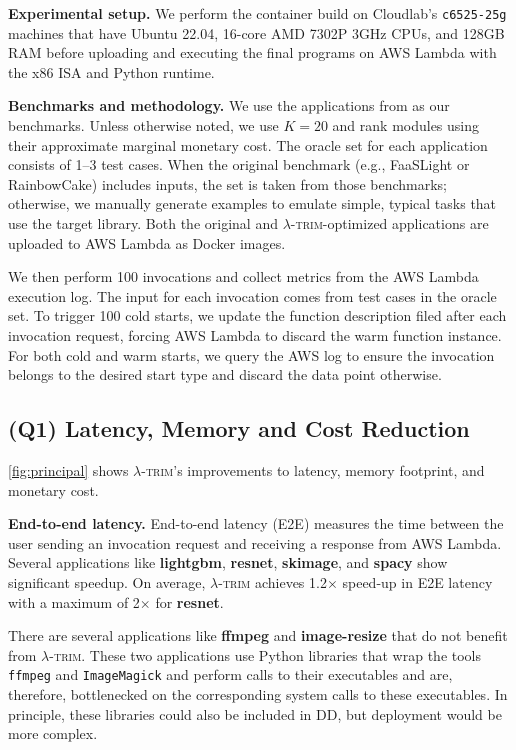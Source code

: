\documentclass[sigplan,screen]{acmart}
\newcommand{\sys}{\textsc{\ensuremath{\lambda}-trim}\xspace}
\newcommand{\topheading}[1]{\noindent\textbf{#1.}}
\newcommand{\heading}[1]{\vspace{4pt}\noindent\textbf{#1.}}
\newcounter{example}
\newcommand{\application}[1]{{\textcolor{pennblue}{\textbf{#1}}}}
\begin{document}
\vspace{-0.35em}
\topheading{Experimental setup}
We perform the container build on Cloudlab's \cite{cloudlab} \texttt{c6525-25g} machines that have Ubuntu 22.04, 16-core AMD 7302P 3GHz CPUs, and 128GB RAM before uploading and executing the final programs on AWS Lambda with the x86 ISA and Python runtime.
 
\heading{Benchmarks and methodology}
We use the applications from  as our benchmarks.
Unless otherwise noted, we use $K=20$ and rank modules using their approximate marginal monetary cost. 
The oracle set for each application consists of 1--3 test cases.
When the original benchmark (e.g., FaaSLight or RainbowCake) includes inputs, the set is taken from those benchmarks;
otherwise, we manually generate examples to emulate simple, typical tasks that use the target library.
Both the original and \sys-optimized applications are uploaded to AWS Lambda as Docker images.

We then perform 100 invocations and collect metrics from the AWS Lambda execution log.
The input for each invocation comes from test cases in the oracle set.
To trigger 100 cold starts, we update the function description filed after each invocation request, forcing AWS Lambda to discard the warm function instance.
For both cold and warm starts, we query the AWS log to ensure the invocation belongs to the desired start type and discard the data point otherwise.


%
 
\subsection{(Q1) Latency, Memory and Cost Reduction}
\cref{fig:principal} shows \sys's improvements to latency, memory footprint, and monetary cost.

\heading{End-to-end latency}
End-to-end latency (E2E) measures the time between the user sending an invocation request and receiving a response from AWS Lambda.
Several applications like \application{lightgbm}, \application{resnet}, \application{skimage}, and \application{spacy} show significant speedup.
On average, \sys achieves 1.2$\times$ speed-up in E2E latency with a maximum of 2$\times$ for \application{resnet}.

There are several applications like \application{ffmpeg} and \application{image-resize} that do not benefit from \sys.
These two applications use Python libraries that wrap the tools \texttt{ffmpeg} and \texttt{ImageMagick} and perform calls to their executables and are, therefore, 
bottlenecked on the corresponding system calls to these executables.
In principle, these libraries could also be included in DD, but deployment would be more complex.
\end{document}
